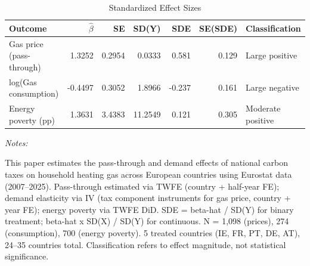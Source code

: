 \begin{table}[!h]
\centering
\caption{Standardized Effect Sizes\label{tab:sde}}
\centering
\begin{threeparttable}
\footnotesize
\begin{tabular}[t]{lrrrrrl}
\toprule
Outcome & $\hat{\beta}$ & SE & SD(Y) & SDE & SE(SDE) & Classification\\
\midrule
Gas price (pass-through) & 1.3252 & 0.2954 & 0.0333 & 0.581 & 0.129 & Large positive\\
log(Gas consumption) & -0.4497 & 0.3052 & 1.8966 & -0.237 & 0.161 & Large negative\\
Energy poverty (pp) & 1.3631 & 3.4383 & 11.2549 & 0.121 & 0.305 & Moderate positive\\
\bottomrule
\end{tabular}
\begin{tablenotes}
\item \textit{Notes:} 
\item This paper estimates the pass-through and demand effects of national carbon taxes on household heating gas across European countries using Eurostat data (2007--2025). Pass-through estimated via TWFE (country + half-year FE); demand elasticity via IV (tax component instruments for gas price, country + year FE); energy poverty via TWFE DiD. SDE = beta-hat / SD(Y) for binary treatment; beta-hat x SD(X) / SD(Y) for continuous. N = 1,098 (prices), 274 (consumption), 700 (energy poverty). 5 treated countries (IE, FR, PT, DE, AT), 24--35 countries total. Classification refers to effect magnitude, not statistical significance.
\end{tablenotes}
\end{threeparttable}
\end{table}
